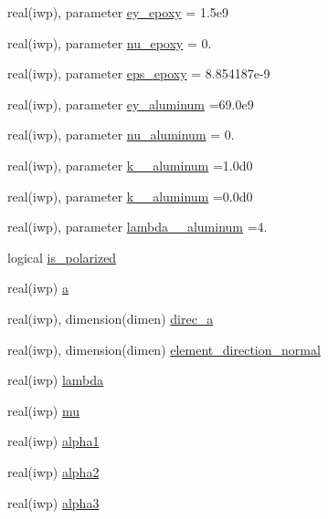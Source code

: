 \begin{DoxyCompactItemize}
real(iwp), parameter \hyperlink{classmaterial__behavior_acecba1d59f399fc0b0aabea4bccee6ce}{ey\+\_\+epoxy} = 1.\+5e9
\item 
real(iwp), parameter \hyperlink{classmaterial__behavior_abac50d1debac288be1148e878784e2eb}{nu\+\_\+epoxy} = 0.
\item 
real(iwp), parameter \hyperlink{classmaterial__behavior_a3fca8d5d93d69c99044b5df2cc3dbd17}{eps\+\_\+epoxy} = 8.\+854187e-\/9
\item 
real(iwp), parameter \hyperlink{classmaterial__behavior_a4805434bdd269ec40107f9347653f183}{ey\+\_\+aluminum} =69.\+0e9
\item 
real(iwp), parameter \hyperlink{classmaterial__behavior_ae5963b3890fba3ea39240613fe4a0557}{nu\+\_\+aluminum} = 0.
\item 
real(iwp), parameter \hyperlink{classmaterial__behavior_a87bcf8ea95320967838eb79ea1185bcf}{k\+\_\+\_\+aluminum} =1.\+0d0
\item 
real(iwp), parameter \hyperlink{classmaterial__behavior_a3258f4bdb606bd94c11a8e59317d271d}{k\+\_\+\_\+aluminum} =0.\+0d0
\item 
real(iwp), parameter \hyperlink{classmaterial__behavior_ab44dd2aa265378e895e462fde60b65c5}{lambda\+\_\+\_\+aluminum} =4.
\item 
logical \hyperlink{classmaterial__behavior_a0b1a41a3f90541df527571959e4c25b5}{is\+\_\+polarized}
\item 
real(iwp) \hyperlink{classmaterial__behavior_a7d56504ef4329ab65c4fc86cd108beb4}{a}
\item 
real(iwp), dimension(dimen) \hyperlink{classmaterial__behavior_a82e31798dc8d8eaa46a7fb9a11b95285}{direc\+\_\+a}
\item 
real(iwp), dimension(dimen) \hyperlink{classmaterial__behavior_a9923e96c82dc6a2982a9f457a2573ee8}{element\+\_\+direction\+\_\+normal}
\item 
real(iwp) \hyperlink{classmaterial__behavior_a29961cc059e7a441ade63d17635929e3}{lambda}
\item 
real(iwp) \hyperlink{classmaterial__behavior_a035801a1d12c0fa9b5c2de3a2e86f63f}{mu}
\item 
real(iwp) \hyperlink{classmaterial__behavior_a0cc1fdb0277dc79da5dfebd44dc2d0df}{alpha1}
\item 
real(iwp) \hyperlink{classmaterial__behavior_a64f16b5401dd56a6ccfaaf8583574f6d}{alpha2}
\item 
real(iwp) \hyperlink{classmaterial__behavior_a70c3b833853f5d5fc20f72c0bd0cee34}{alpha3}
\item 

\end{DoxyCompactItemize}
